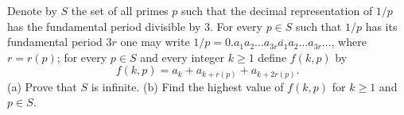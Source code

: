 Denote by $S$ the set of all primes $p$ such that the decimal representation of $1/p$ has the fundamental period divisible by 3. For every $p \in S$ such that $1/p$ has its fundamental period $3r$ one may write $1/p = 0.\overline{a_1 a_2 \ldots a_{3r} a_1 a_2 \ldots a_{3r} \ldots}$, where $r = r(p)$; for every $p \in S$ and every integer $k \geq 1$ define $f(k, p)$ by
\[ f(k, p) = a_k + a_{k+r(p)} + a_{k+2r(p)}. \]
(a) Prove that $S$ is infinite.
(b) Find the highest value of $f(k, p)$ for $k \geq 1$ and $p \in S$.
